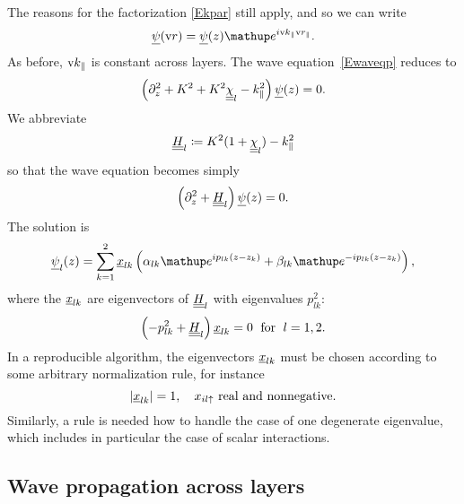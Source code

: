 The reasons for the factorization \cref{Ekpar} still apply,
and so we can write
\begin{equation}\label{Ewave3p}
\u\psi(\r) = \u\psi(z) \e^{i \k_\parallel\r_\parallel}.
\end{equation}
As before, $\text{v}{k}_\parallel$ is constant across layers.
The wave equation~\cref{Ewaveqp} reduces to
\begin{equation}\label{Ewavezp}
\left(\partial_z^2 + K^2 + K^2\underline{\underline{\chi}}_l - k_\parallel^2 \right) \underline{\psi}(z) = 0.
\end{equation}
We abbreviate
\begin{equation}
  \underline{\underline{H}}_l \coloneqq  K^2(1+\underline{\underline{\chi}}_l)-k_\parallel^2
\end{equation}
so that the wave equation becomes simply
\begin{equation}\label{Ewaveqp2}
  \left(\partial_z^2 + \underline{\underline{H}}_l\right) \underline{\psi}(z) = 0.
\end{equation}
The solution is
\begin{equation}\label{Epsizp}
  \u\psi_l(z)
  = \sum_{k=1}^2 \u x_{l k}\left(\alpha_{l k}\e^{i p_{l k}(z-z_k)}
                            + \beta_{l k}\e^{-i p_{l k}(z-z_k)}\right),
\end{equation}
where the $\underline{x}_{l k}$ are eigenvectors of $\underline{\underline{H}}_l$
with eigenvalues $p_{l k}^2$:
\begin{equation}
  \left( -p_{l k}^2 + \underline{\underline{H}}_l \right) \underline{x}_{l k} = 0
   \;\text{ for }\;l=1,2.
\end{equation}
In a reproducible algorithm,
the eigenvectors $\underline{x}_{l k}$ must be chosen according to some arbitrary
normalization rule,
for instance
\begin{equation}
  |\underline{x}_{l k}|=1,\quad x_{il\uparrow} \text{ real and nonnegative}.
\end{equation}
Similarly,
a rule is needed how to handle the case of one degenerate eigenvalue,
which includes in particular the case of scalar interactions.


\subsection{Wave propagation across layers}

